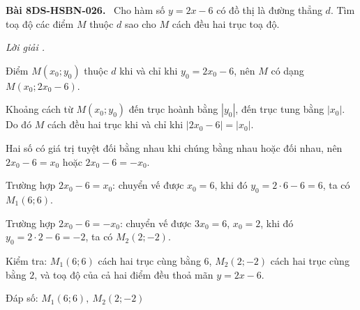 \documentclass[12pt,a4paper]{article}
\newenvironment{problem}[1][]{\par\medskip\noindent\textbf{Bài #1.}\ }{\par}
\newenvironment{solution}[1][]{\par\noindent\textit{Lời giải #1.}\par}{\par}
\begin{document}
\begin{problem}[8DS-HSBN-026]
Cho hàm số $y = 2x - 6$ có đồ thị là đường thẳng $d$. Tìm toạ độ các điểm $M$ thuộc $d$ sao cho $M$ cách đều hai trục toạ độ.

\begin{solution}
Điểm $M(x_0; y_0)$ thuộc $d$ khi và chỉ khi $y_0 = 2x_0 - 6$, nên $M$ có dạng $M(x_0; 2x_0 - 6)$.

Khoảng cách từ $M(x_0; y_0)$ đến trục hoành bằng $|y_0|$, đến trục tung bằng $|x_0|$. Do đó $M$ cách đều hai trục khi và chỉ khi $|2x_0 - 6| = |x_0|$.

Hai số có giá trị tuyệt đối bằng nhau khi chúng bằng nhau hoặc đối nhau, nên $2x_0 - 6 = x_0$ hoặc $2x_0 - 6 = -x_0$.

Trường hợp $2x_0 - 6 = x_0$: chuyển vế được $x_0 = 6$, khi đó $y_0 = 2 \cdot 6 - 6 = 6$, ta có $M_1(6; 6)$.

Trường hợp $2x_0 - 6 = -x_0$: chuyển vế được $3x_0 = 6$, $x_0 = 2$, khi đó $y_0 = 2 \cdot 2 - 6 = -2$, ta có $M_2(2; -2)$.

Kiểm tra: $M_1(6; 6)$ cách hai trục cùng bằng $6$, $M_2(2; -2)$ cách hai trục cùng bằng $2$, và toạ độ của cả hai điểm đều thoả mãn $y = 2x - 6$.

Đáp số: $\boxed{M_1(6; 6),\ M_2(2; -2)}$
\end{solution}
\end{problem}
\end{document}
